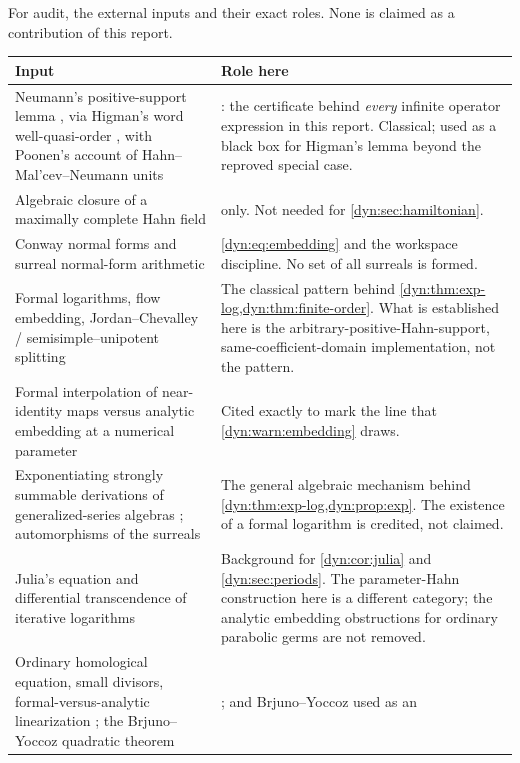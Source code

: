 \documentclass[11pt,letterpaper]{article}
\theoremstyle{definition}
\theoremstyle{remark}
\numberwithin{equation}{section}
\begin{document}
For audit, the external inputs and their exact roles. None is claimed as a
contribution of this report.
\begin{longtable}{@{}P{0.30\textwidth}P{0.62\textwidth}@{}}
\toprule
Input & Role here\\
\midrule
\endhead
Neumann's positive-support lemma \cite{Neumann}, via Higman's word
well-quasi-order \cite{Higman}, with Poonen's account of
Hahn--Mal'cev--Neumann units \cite{Poonen}
& : the certificate
behind \emph{every} infinite operator expression in this report. Classical;
used as a black box for Higman's lemma beyond the reproved special case.\\[3pt]
Algebraic closure of a maximally complete Hahn field
\cite[Cor.~4]{Poonen}
&  only. Not needed for
\cref{dyn:sec:hamiltonian}.\\[3pt]
Conway normal forms and surreal normal-form arithmetic \cite{Gonshor}
& \eqref{dyn:eq:embedding} and the workspace discipline. No set of all
surreals is formed.\\[3pt]
Formal logarithms, flow embedding, Jordan--Chevalley /
semisimple--unipotent splitting \cite{Ribon}
& The classical pattern behind
\cref{dyn:thm:exp-log,dyn:thm:finite-order}. What is established here is
the arbitrary-positive-Hahn-support, same-coefficient-domain
implementation, not the pattern.\\[3pt]
Formal interpolation of near-identity maps versus analytic embedding at a
numerical parameter \cite{GV}
& Cited exactly to mark the line that
\cref{dyn:warn:embedding} draws.\\[3pt]
Exponentiating strongly summable derivations of generalized-series algebras
\cite{BKKPS}; automorphisms of the surreals \cite{KKS}
& The general algebraic mechanism behind
\cref{dyn:thm:exp-log,dyn:prop:exp}. The existence of a formal logarithm is
credited, not claimed.\\[3pt]
Julia's equation and differential transcendence of iterative logarithms
\cite{AB}
& Background for \cref{dyn:cor:julia} and
\cref{dyn:sec:periods}. The parameter-Hahn construction here is a
different category; the analytic embedding obstructions for ordinary
parabolic germs are not removed.\\[3pt]
Ordinary homological equation, small divisors, formal-versus-analytic
linearization \cite{CarlettiMarmi,Marmi}; the Brjuno--Yoccoz quadratic
theorem \cite{Yoccoz,BuffCheritat}
& ; and Brjuno--Yoccoz used as an

\end{longtable}
\end{document}

